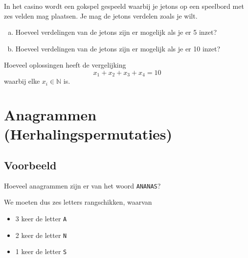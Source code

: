 \documentclass[12pt,a4paper,twoside]{article}
\begin{document}
\begin{oefening}
In het casino wordt een gokspel gespeeld waarbij je jetons op een speelbord met zes velden mag plaatsen. Je mag de jetons verdelen zoals je wilt.
\begin{enumerate}[(a)]
  \item Hoeveel verdelingen van de jetons zijn er mogelijk als je er 5 inzet?
  \item Hoeveel verdelingen van de jetons zijn er mogelijk als je er 10 inzet?
\end{enumerate}
\end{oefening}

\begin{oefening} %
Hoeveel oplossingen heeft de vergelijking
$$x_1 + x_2 + x_3 + x_4 = 10$$
waarbij elke $x_i\in\mathbb{N}$ is.
\end{oefening}

\cleardoublepage
\section{Anagrammen (Herhalingspermutaties)}

\subsection{Voorbeeld}

Hoeveel anagrammen zijn er van het woord \verb#ANANAS#?

We moeten dus zes letters rangschikken, waarvan
\begin{itemize}
  \item 3 keer de letter \verb#A#
  \item 2 keer de letter \verb#N#
  \item 1 keer de letter \verb#S#
\end{itemize}
\end{document}
